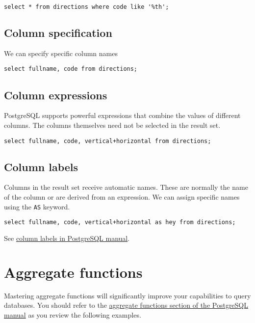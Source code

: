 \begin{verbatim}
select * from directions where code like '%th'; 
\end{verbatim}

\subsection{Column specification}\label{column-specification}

We can specify specific column names

\begin{verbatim}
select fullname, code from directions;
\end{verbatim}

\subsection{Column expressions}\label{column-expressions}

PostgreSQL supports powerful expressions that combine the values of
different columns. The columns themselves need not be selected in the
result set.

\begin{verbatim}
select fullname, code, vertical+horizontal from directions;
\end{verbatim}

\subsection{Column labels}\label{column-labels}

Columns in the result set receive automatic names. These are normally
the name of the column or are derived from an expression. We can assign
specific names using the \texttt{AS} keyword.

\begin{verbatim}
select fullname, code, vertical+horizontal as hey from directions;
\end{verbatim}

See
\href{https://www.postgresql.org/docs/13/queries-select-lists.html\#QUERIES-COLUMN-LABELS}{column
labels in PostgreSQL manual}.

\section{Aggregate functions}\label{aggregate-functions}

Mastering aggregate functions will significantly improve your
capabilities to query databases. You should refer to the
\href{https://www.postgresql.org/docs/13/functions-aggregate.html}{aggregate
functions section of the PostgreSQL manual} as you review the following
examples.

